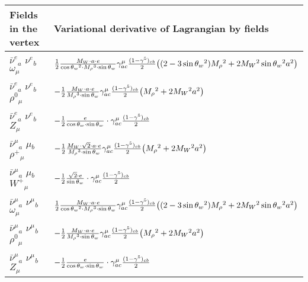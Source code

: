 \begin{center}
\begin{tabular}{|l|l|} \hline
Fields in the vertex & Variational derivative of Lagrangian by fields \\ \hline
$\bar{\nu}^e{}_{a }$ \phantom{-} $\nu^e{}_{b }$ \phantom{-} $\omega{}_{\mu }$ \phantom{-}  &
	$\frac{1}{2}\frac{ M_W \cdot a \cdot e}{ \cos{\theta}_w{}^2  \cdot M_\rho{}^3  \cdot \sin{\theta}_w}\gamma_{a c}^\mu {(1-\gamma^5)_{c b}\over 2} \big( (2-3 \sin{\theta}_w {}^2) M_\rho{}^2 +2 M_W{}^2  \sin{\theta}_w{}^2  a{}^2 \big)$\\[2mm]
$\bar{\nu}^e{}_{a }$ \phantom{-} $\nu^e{}_{b }$ \phantom{-} $\rho^0{}_{\mu }$ \phantom{-}  &
	$-\frac{1}{2}\frac{ M_W \cdot a \cdot e}{ M_\rho{}^3  \cdot \sin{\theta}_w}\gamma_{a c}^\mu {(1-\gamma^5)_{c b}\over 2} \big( M_\rho{}^2 +2 M_W{}^2  a{}^2 \big)$\\[2mm]
$\bar{\nu}^e{}_{a }$ \phantom{-} $\nu^e{}_{b }$ \phantom{-} ${Z}_{\mu }$ \phantom{-}  &
	$-\frac{1}{2}\frac{ e}{ \cos{\theta}_w \cdot \sin{\theta}_w}\cdot \gamma_{a c}^\mu {(1-\gamma^5)_{c b}\over 2} $\\[2mm]
$\bar{\nu}^\mu{}_{a }$ \phantom{-} $\mu{}_{b }$ \phantom{-} $\rho^+{}_{\mu }$ \phantom{-}  &
	$-\frac{1}{2}\frac{ M_W \cdot\sqrt{2} \cdot a \cdot e}{ M_\rho{}^3  \cdot \sin{\theta}_w}\gamma_{a c}^\mu {(1-\gamma^5)_{c b}\over 2} \big( M_\rho{}^2 +2 M_W{}^2  a{}^2 \big)$\\[2mm]
$\bar{\nu}^\mu{}_{a }$ \phantom{-} $\mu{}_{b }$ \phantom{-} $W^+{}_{\mu }$ \phantom{-}  &
	$-\frac{1}{2}\frac{\sqrt{2} \cdot e}{ \sin{\theta}_w}\cdot \gamma_{a c}^\mu {(1-\gamma^5)_{c b}\over 2} $\\[2mm]
$\bar{\nu}^\mu{}_{a }$ \phantom{-} $\nu^\mu{}_{b }$ \phantom{-} $\omega{}_{\mu }$ \phantom{-}  &
	$\frac{1}{2}\frac{ M_W \cdot a \cdot e}{ \cos{\theta}_w{}^2  \cdot M_\rho{}^3  \cdot \sin{\theta}_w}\gamma_{a c}^\mu {(1-\gamma^5)_{c b}\over 2} \big( (2-3 \sin{\theta}_w {}^2) M_\rho{}^2 +2 M_W{}^2  \sin{\theta}_w{}^2  a{}^2 \big)$\\[2mm]
$\bar{\nu}^\mu{}_{a }$ \phantom{-} $\nu^\mu{}_{b }$ \phantom{-} $\rho^0{}_{\mu }$ \phantom{-}  &
	$-\frac{1}{2}\frac{ M_W \cdot a \cdot e}{ M_\rho{}^3  \cdot \sin{\theta}_w}\gamma_{a c}^\mu {(1-\gamma^5)_{c b}\over 2} \big( M_\rho{}^2 +2 M_W{}^2  a{}^2 \big)$\\[2mm]
$\bar{\nu}^\mu{}_{a }$ \phantom{-} $\nu^\mu{}_{b }$ \phantom{-} ${Z}_{\mu }$ \phantom{-}  &
	$-\frac{1}{2}\frac{ e}{ \cos{\theta}_w \cdot \sin{\theta}_w}\cdot \gamma_{a c}^\mu {(1-\gamma^5)_{c b}\over 2} $\\[2mm]

\end{tabular}
\end{center}
